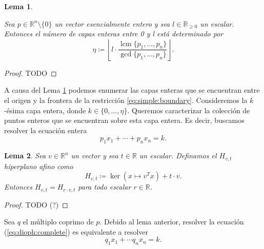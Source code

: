 \documentclass[11pt]{article}
\newtheorem{lemma}{Lema}
\DeclareMathOperator{\lcm}{lcm}
\begin{document}

\begin{lemma}
	\label{lemma:num_layers}

	Sea $p \in \mathbb{R}^n \setminus \lbrace 0 \rbrace$ un vector esencialmente entero y sea $l \in
	\mathbb{R}_{\geq 0}$ un escalar. Entonces el número de capas enteras entre 0 y l está
	determinado por
	\begin{equation}
		\label{eq:num_layers}
		\eta \coloneq
		\left\lfloor
			l \cdot \frac{\lcm\lbrace p_1, \ldots, p_n \rbrace}{\gcd\lbrace p_1, \ldots, p_n \rbrace}
		\right\rfloor.
	\end{equation}
\end{lemma}
\begin{proof}
	TODO
\end{proof}

A causa del Lema \ref{lemma:num_layers} podemos enumerar las capas enteras que se encuentran entre
el origen y la frontera de la restricción \ref{eq:simple:boundary}. Consideremos la $k$-ésima capa
entera, donde $k \in \lbrace 0, \ldots, \eta \rbrace$. Queremos caracterizar la colección de puntos
enteros que se encuentran sobre esta capa entera. Es decir, buscamos resolver la ecuación entera
\begin{equation}
	\label{eq:dioph:complete}
	p_1x_1 + \cdots + p_nx_n = k.
\end{equation}

\begin{lemma}
	Sea $v \in \mathbb{R}^n$ un vector y sea $t \in \mathbb{R}$ un escalar. Definamos el $H_{v, t}$
	hiperplano afino como
	\begin{equation*}
		H_{v, t} \coloneq \ker(x \mapsto v^Tx) + t \cdot v.
	\end{equation*}
	Entonces $H_{v, t} = H_{r \cdot v, t}$ para todo escalar $r \in \mathbb{R}$.
\end{lemma}
\begin{proof}
	TODO (?)
\end{proof}

Sea $q$ el múltiplo coprimo de $p$. Debido al lema anterior, resolver la ecuación
(\ref{eq:dioph:complete}) es equivalente a resolver
\begin{equation}
	\label{eq:dioph:complete:coprime}
	q_1x_1 + \cdots q_nx_n = k.
\end{equation}
\end{document}
